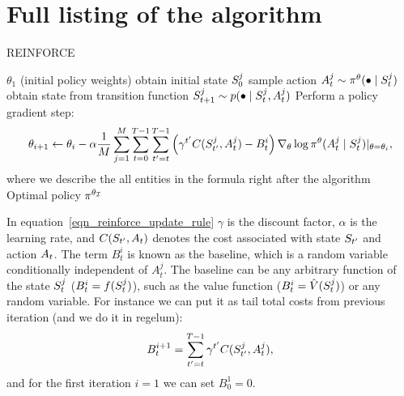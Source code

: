 \documentclass[12pt,twoside]{../../mitthesis}
\begin{document}
\section*{Full listing of the algorithm}
\begin{algorithm}
    \caption{REINFORCE}
    \label{alg:my-alg}
    \begin{algorithmic}
     $\theta_1$ (initial policy weights)
            \STATE obtain initial state $S_0^{j}$
                \STATE sample action $A_t^j \sim \pi^{\theta}(\bullet \mid S_t^{j})$
                \STATE obtain state from transition function $S_{t+1}^j \sim p(\bullet \mid S_t^j, A_t^j)$
            \ENDFOR
        \ENDFOR
        \STATE  Perform a policy gradient step:
        \begin{equation}
        \label{eqn_reinforce_update_rule}
            \theta_{i+1} \leftarrow \theta_i - \alpha \frac{1}{M}\sum_{j = 1}^M \sum_{t = 0}^{T-1}\sum_{t'=t}^{T-1}\left( \gamma^{t'} C(S_{t'}^j, A_t^j) - B_{t}^i\right) \nabla_{\theta}\log \pi^{\theta}(A_t^j \mid S_t^j)\rvert_{\theta = \theta_i},
        \end{equation}
        \STATE where we describe the all entities in the formula right after the algorithm
    \ENDFOR
    \STATE \RETURN Optimal policy $\pi^{\theta_{\mathcal I}}$
    \end{algorithmic}
\end{algorithm}

In equation~\eqref{eqn_reinforce_update_rule} $\gamma$ is the discount factor, $\alpha$ is the learning rate, and $C(S_{t'}, A_t)$ denotes the cost associated with state $S_{t'}$ and action $A_t$. The term $B_t^i$ is known as the baseline, which is a random variable conditionally independent of $A_t^j$. The baseline can be any arbitrary function of the state $S_t^j$ ($B_t^i = f(S_t^j)$), such as the value function ($B_t^i = \hat{V}(S_t^j)$) or any random variable. 
        For instance we can put it as tail total costs from previous iteration (and we do it in regelum):
        $$
            B_t^{i + 1} = \sum_{t'=t}^{T-1}\gamma^{t'} C(S_{t'}^j, A_t^j), 
        $$
        and for the first iteration $i = 1$ we can set $B_0^1 = 0$.
\end{document}

